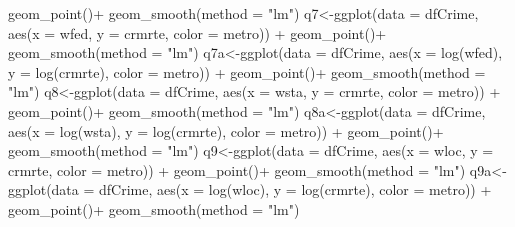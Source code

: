 \documentclass[]{article}
\newenvironment{Shaded}{}{}
\newcommand{\DataTypeTok}[1]{#1}
\newcommand{\KeywordTok}[1]{\textcolor[rgb]{0.00,0.00,1.00}{#1}}
\newcommand{\NormalTok}[1]{#1}
\newcommand{\OperatorTok}[1]{#1}
\newcommand{\StringTok}[1]{\textcolor[rgb]{0.00,0.50,0.50}{#1}}
\begin{document}
\begin{Shaded}
\begin{Highlighting}[]
\StringTok{      }\KeywordTok{geom_point}\NormalTok{()}\OperatorTok{+}
\StringTok{  }\KeywordTok{geom_smooth}\NormalTok{(}\DataTypeTok{method =} \StringTok{"lm"}\NormalTok{)}
\NormalTok{q7<-}\KeywordTok{ggplot}\NormalTok{(}\DataTypeTok{data =}\NormalTok{ dfCrime, }\KeywordTok{aes}\NormalTok{(}\DataTypeTok{x =}\NormalTok{ wfed, }\DataTypeTok{y =}\NormalTok{ crmrte, }\DataTypeTok{color =}\NormalTok{ metro)) }\OperatorTok{+}\StringTok{ }
\StringTok{      }\KeywordTok{geom_point}\NormalTok{()}\OperatorTok{+}
\StringTok{  }\KeywordTok{geom_smooth}\NormalTok{(}\DataTypeTok{method =} \StringTok{"lm"}\NormalTok{)}
\NormalTok{q7a<-}\KeywordTok{ggplot}\NormalTok{(}\DataTypeTok{data =}\NormalTok{ dfCrime, }\KeywordTok{aes}\NormalTok{(}\DataTypeTok{x =} \KeywordTok{log}\NormalTok{(wfed), }\DataTypeTok{y =} \KeywordTok{log}\NormalTok{(crmrte), }\DataTypeTok{color =}\NormalTok{ metro)) }\OperatorTok{+}\StringTok{ }
\StringTok{      }\KeywordTok{geom_point}\NormalTok{()}\OperatorTok{+}
\StringTok{  }\KeywordTok{geom_smooth}\NormalTok{(}\DataTypeTok{method =} \StringTok{"lm"}\NormalTok{)}
\NormalTok{q8<-}\KeywordTok{ggplot}\NormalTok{(}\DataTypeTok{data =}\NormalTok{ dfCrime, }\KeywordTok{aes}\NormalTok{(}\DataTypeTok{x =}\NormalTok{ wsta, }\DataTypeTok{y =}\NormalTok{ crmrte, }\DataTypeTok{color =}\NormalTok{ metro)) }\OperatorTok{+}\StringTok{ }
\StringTok{      }\KeywordTok{geom_point}\NormalTok{()}\OperatorTok{+}
\StringTok{  }\KeywordTok{geom_smooth}\NormalTok{(}\DataTypeTok{method =} \StringTok{"lm"}\NormalTok{)}
\NormalTok{q8a<-}\KeywordTok{ggplot}\NormalTok{(}\DataTypeTok{data =}\NormalTok{ dfCrime, }\KeywordTok{aes}\NormalTok{(}\DataTypeTok{x =} \KeywordTok{log}\NormalTok{(wsta), }\DataTypeTok{y =} \KeywordTok{log}\NormalTok{(crmrte), }\DataTypeTok{color =}\NormalTok{ metro)) }\OperatorTok{+}\StringTok{ }
\StringTok{      }\KeywordTok{geom_point}\NormalTok{()}\OperatorTok{+}
\StringTok{  }\KeywordTok{geom_smooth}\NormalTok{(}\DataTypeTok{method =} \StringTok{"lm"}\NormalTok{)}
\NormalTok{q9<-}\KeywordTok{ggplot}\NormalTok{(}\DataTypeTok{data =}\NormalTok{ dfCrime, }\KeywordTok{aes}\NormalTok{(}\DataTypeTok{x =}\NormalTok{ wloc, }\DataTypeTok{y =}\NormalTok{ crmrte, }\DataTypeTok{color =}\NormalTok{ metro)) }\OperatorTok{+}\StringTok{ }
\StringTok{      }\KeywordTok{geom_point}\NormalTok{()}\OperatorTok{+}
\StringTok{  }\KeywordTok{geom_smooth}\NormalTok{(}\DataTypeTok{method =} \StringTok{"lm"}\NormalTok{)}
\NormalTok{q9a<-}\KeywordTok{ggplot}\NormalTok{(}\DataTypeTok{data =}\NormalTok{ dfCrime, }\KeywordTok{aes}\NormalTok{(}\DataTypeTok{x =} \KeywordTok{log}\NormalTok{(wloc), }\DataTypeTok{y =} \KeywordTok{log}\NormalTok{(crmrte), }\DataTypeTok{color =}\NormalTok{ metro)) }\OperatorTok{+}\StringTok{ }
\StringTok{      }\KeywordTok{geom_point}\NormalTok{()}\OperatorTok{+}
\StringTok{  }\KeywordTok{geom_smooth}\NormalTok{(}\DataTypeTok{method =} \StringTok{"lm"}\NormalTok{)}


\end{Highlighting}
\end{Shaded}
\end{document}
